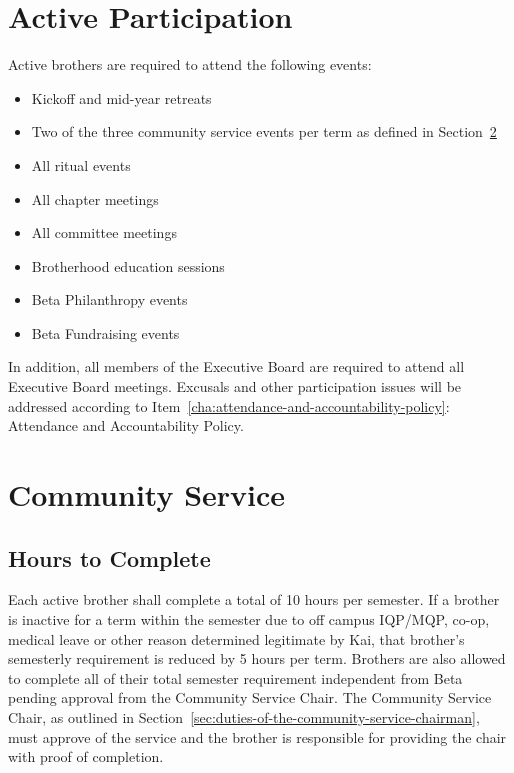 \section{Active Participation}
\label{sec:active-participation}

Active brothers are required to attend the following events:

\begin{itemize}
	\item Kickoff and mid-year retreats
	\item Two of the three community service events per term as defined
		in Section~\ref{sec:community-service}
	\item All ritual events
	\item All chapter meetings
	\item All committee meetings
	\item Brotherhood education sessions
	\item Beta Philanthropy events
	\item Beta Fundraising events
\end{itemize}

In addition, all members of the Executive Board are required to attend all
Executive Board meetings.
Excusals and other participation issues will be addressed according to
Item~\ref{cha:attendance-and-accountability-policy}: Attendance and
Accountability Policy.

\section{Community Service}
\label{sec:community-service}

\subsection{Hours to Complete}
\label{sec:hours-to-complete}

Each active brother shall complete a total of 10 hours per semester.
If a brother is inactive for a term within the semester due to off campus
IQP/MQP, co-op, medical leave or other reason determined legitimate by Kai, that
brother’s semesterly requirement is reduced by 5 hours per term.
Brothers are
also allowed to complete all of their total semester requirement independent
from Beta pending approval from the Community Service Chair.
The Community Service Chair, as outlined in
Section~\ref{sec:duties-of-the-community-service-chairman}, must approve of the
service and the brother is responsible for providing the chair with proof of
completion.

